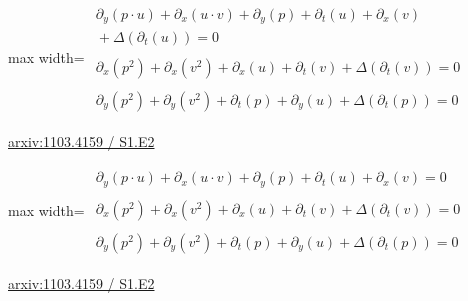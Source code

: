 \documentclass[UTF8,10pt,a4paper,fontset=mac]{ctexart}
\begin{document}
\begin{minipage}{\linewidth}\begin{center}\begin{adjustbox}{max width=\linewidth}$\displaystyle\begin{gathered}\begin{gathered}\partial_{y}(p\cdot u)+\partial_{x}(u\cdot v)+\partial_{y}(p)+\partial_{t}(u)+\partial_{x}(v)\\[-1pt]{}+\Delta(\partial_{t}(u))=0\end{gathered}\\[5pt]\begin{gathered}\partial_{x}(p^{2})+\partial_{x}(v^{2})+\partial_{x}(u)+\partial_{t}(v)+\Delta(\partial_{t}(v))=0\end{gathered}\\[5pt]\begin{gathered}\partial_{y}(p^{2})+\partial_{y}(v^{2})+\partial_{t}(p)+\partial_{y}(u)+\Delta(\partial_{t}(p))=0\end{gathered}\end{gathered}$\end{adjustbox}\end{center}{\small\href{https://arxiv.org/html/1103.4159#S1.E2}{arxiv:1103.4159 / S1.E2}}\par\end{minipage}\par\vspace{6mm}

\begin{minipage}{\linewidth}\begin{center}\begin{adjustbox}{max width=\linewidth}$\displaystyle\begin{gathered}\begin{gathered}\partial_{y}(p\cdot u)+\partial_{x}(u\cdot v)+\partial_{y}(p)+\partial_{t}(u)+\partial_{x}(v)=0\end{gathered}\\[5pt]\begin{gathered}\partial_{x}(p^{2})+\partial_{x}(v^{2})+\partial_{x}(u)+\partial_{t}(v)+\Delta(\partial_{t}(v))=0\end{gathered}\\[5pt]\begin{gathered}\partial_{y}(p^{2})+\partial_{y}(v^{2})+\partial_{t}(p)+\partial_{y}(u)+\Delta(\partial_{t}(p))=0\end{gathered}\end{gathered}$\end{adjustbox}\end{center}{\small\href{https://arxiv.org/html/1103.4159#S1.E2}{arxiv:1103.4159 / S1.E2}}\par\end{minipage}\par\vspace{6mm}
\end{document}
